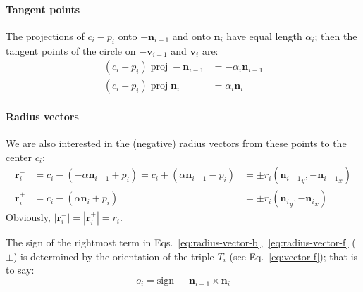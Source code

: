 \documentclass{article}
\begin{document}
\paragraph{Tangent points}
%
The projections of $c_{i}-p_{i}$ onto $-\mathbf{n}_{i-1}$ and onto $\mathbf{n}_{i}$ have equal length $\alpha_i$; then the tangent points of the circle on $-\mathbf{v}_{i-1}$ and $\mathbf{v}_{i}$ are:
%
\begin{align}
  \label{eq:alpha-vector-b}
  \left(c_{i}-p_{i}\right)\;\mathrm{proj}\; -\mathbf{n}_{i-1} &= -\alpha_i\mathbf{n}_{i-1}\\
  \label{eq:alpha-vector-f}
  \left(c_{i}-p_{i}\right)\;\mathrm{proj}\; \mathbf{n}_{i} &= \alpha_i\mathbf{n}_{i}
\end{align}
%
\paragraph{Radius vectors}
%
We are also interested in the (negative) radius vectors from these points to the center $c_{i}$:
%
\begin{align}
  \label{eq:radius-vector-b}
  \mathbf{r}^{-}_{i} &= c_{i} - \left(-\alpha\mathbf{n}_{i-1} + p_{i}\right)=c_{i} + \left(\alpha\mathbf{n}_{i-1} - p_{i}\right)&=\pm r_i\left({\mathbf{n}_{i-1}}_{y},  -{\mathbf{n}_{i-1}}_{x} \right)\\
  \label{eq:radius-vector-f}
  \mathbf{r}^{+}_{i} &= c_{i} - \left(\alpha\mathbf{n}_{i} + p_{i}\right)&=\pm r_i\left(  {\mathbf{n}_{i}}_{y}, -{\mathbf{n}_{i}}_{x} \right)
\end{align}
%
Obviously, $\left|\mathbf{r}^{-}_{i}\right| = \left|\mathbf{r}^{+}_{i}\right| = r_{i}$.

The sign of the rightmost term in Eqs.~\eqref{eq:radius-vector-b},~\eqref{eq:radius-vector-f} ($\pm$) is determined by the orientation of the triple $T_i$ (see Eq.~\eqref{eq:vector-f}); that is to say:
%
\begin{equation}
  \label{eq:orientation}
  o_i = \mathrm{sign}\; -\mathbf{n}_{i-1} \times \mathbf{n}_{i}
\end{equation}
%
\end{document}
